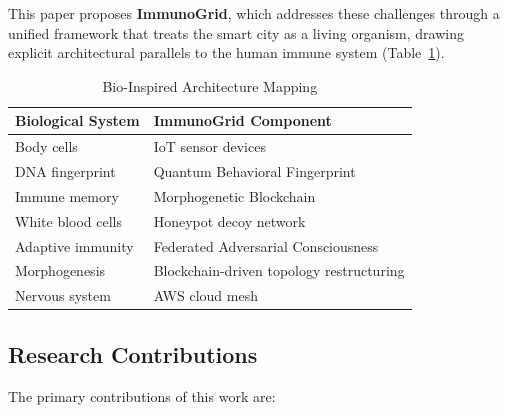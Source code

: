 \documentclass[journal]{IEEEtran}
\begin{document}
This paper proposes \textbf{ImmunoGrid}, which addresses these challenges
through a unified framework that treats the smart city as a living organism,
drawing explicit architectural parallels to the human immune system
(Table~\ref{tab:bio_analogy}).

\begin{table}[h]
\caption{Bio-Inspired Architecture Mapping}
\label{tab:bio_analogy}
\centering
\begin{tabular}{ll}
\toprule
\textbf{Biological System} & \textbf{ImmunoGrid Component} \\
\midrule
Body cells & IoT sensor devices \\
DNA fingerprint & Quantum Behavioral Fingerprint \\
Immune memory & Morphogenetic Blockchain \\
White blood cells & Honeypot decoy network \\
Adaptive immunity & Federated Adversarial Consciousness \\
Morphogenesis & Blockchain-driven topology restructuring \\
Nervous system & AWS cloud mesh \\
\bottomrule
\end{tabular}
\end{table}

\subsection{Research Contributions}
The primary contributions of this work are:
\end{document}
